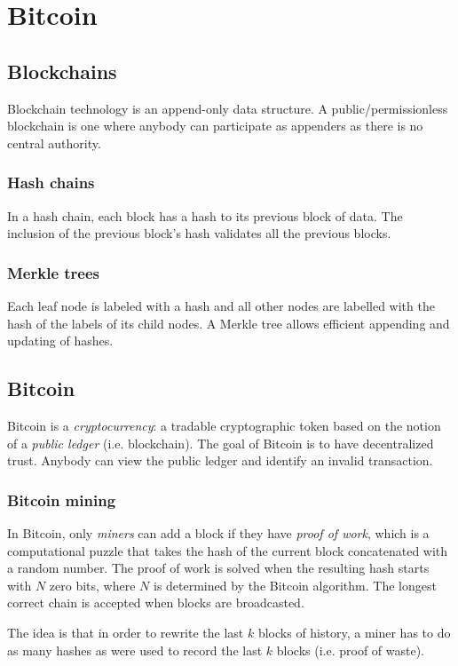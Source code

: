 \chapter{Bitcoin}

\section{Blockchains}
Blockchain technology is an append-only data structure. A public/permissionless blockchain is one where anybody can participate as appenders as there is no central authority.

\subsection{Hash chains}
In a hash chain, each block has a hash to its previous block of data. The inclusion of the previous block's hash validates all the previous blocks. 

\subsection{Merkle trees}
Each leaf node is labeled with a hash and all other nodes are labelled with the hash of the labels of its child nodes. A Merkle tree allows efficient appending and updating of hashes. 

\section{Bitcoin}
Bitcoin is a \emph{cryptocurrency}: a tradable cryptographic token based on the notion of a \emph{public ledger} (i.e. blockchain). The goal of Bitcoin is to have decentralized trust. Anybody can view the public ledger and identify an invalid transaction.

\subsection{Bitcoin mining}
In Bitcoin, only \emph{miners} can add a block if they have \emph{proof of work}, which is a computational puzzle that takes the hash of the current block concatenated with a random number. The proof of work is solved when the resulting hash starts with $N$ zero bits, where $N$ is determined by the Bitcoin algorithm. The longest correct chain is accepted when blocks are broadcasted.

\medskip

The idea is that in order to rewrite the last $k$ blocks of history, a miner has to do as many hashes as were used to record the last $k$ blocks (i.e. proof of waste).

